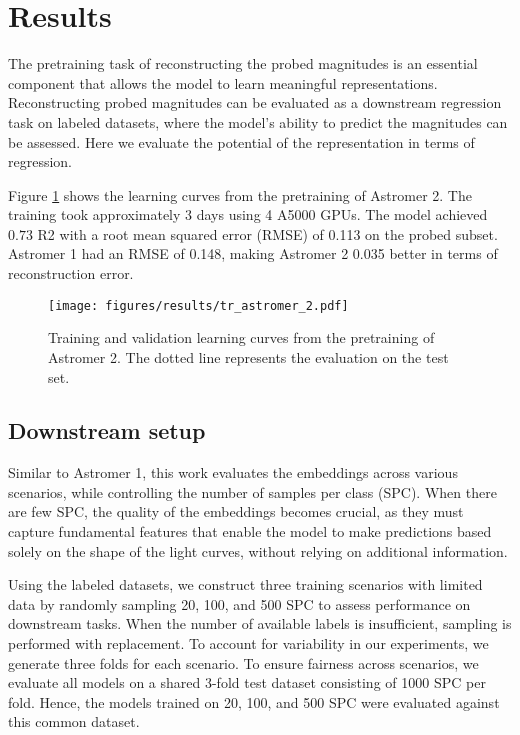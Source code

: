\section{Results}\label{sec:results}
The pretraining task of reconstructing the probed magnitudes is an essential component that allows the model to learn meaningful representations. Reconstructing probed magnitudes can be evaluated as a downstream regression task on labeled datasets, where the model's ability to predict the magnitudes can be assessed. Here we evaluate the potential of the representation in terms of regression.

Figure \ref{fig:trastromerv1} shows the learning curves from the pretraining of Astromer 2. The training took approximately 3 days using 4 A5000 GPUs. The model achieved $0.73$ R2 with a root mean squared error (RMSE) of 0.113 on the probed subset. Astromer 1 had an RMSE of 0.148, making Astromer 2 0.035 better in terms of reconstruction error.  

\begin{figure}
    \centering
    \texttt{[image: figures/results/tr\_astromer\_2.pdf]}
    \caption{Training and validation learning curves from the pretraining of Astromer 2. The dotted line represents the evaluation on the test set.}
    \label{fig:trastromerv1}
\end{figure}

\subsection{Downstream setup}
Similar to Astromer 1, this work evaluates the embeddings across various scenarios, while controlling the number of samples per class (SPC). When there are few SPC, the quality of the embeddings becomes crucial, as they must capture fundamental features that enable the model to make predictions based solely on the shape of the light curves, without relying on additional information.

Using the labeled datasets, we construct three training scenarios with limited data by randomly sampling 20, 100, and 500 SPC to assess performance on downstream tasks. When the number of available labels is insufficient, sampling is performed with replacement. To account for variability in our experiments, we generate three folds for each scenario. To ensure fairness across scenarios, we evaluate all models on a shared 3-fold test dataset consisting of 1000 SPC per fold.
Hence, the models trained on 20, 100, and 500 SPC were evaluated against this common dataset.

